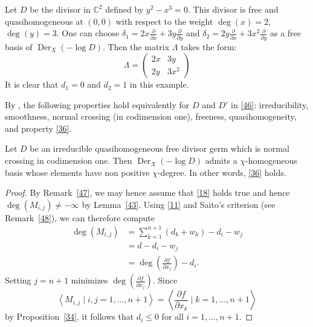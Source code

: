 \begin{exa}
Let $D$ be the divisor in ${\mathds{C}}^2$ defined by $y^2-x^3=0$. 
This divisor is free and quasihomogeneous at $(0,0)$ with respect to the weight $\deg(x)=2$, $\deg(y)=3$. 
One can choose $\delta_1=2x \frac{\partial}{\partial x} + 3 y \frac{\partial}{\partial y}$ and $\delta_2=2y\frac{\partial}{\partial x} + 3x^2\frac{\partial}{\partial y}$ as a free basis of $\operatorname{Der}_X(-\log D)$. 
Then the matrix $\Lambda$ takes the form:
\begin{equation*}
\Lambda=
\begin{pmatrix}
2x & 3y \\
2y & 3x^2
\end{pmatrix}
\end{equation*}
It is clear that $d_1=0$ and $d_2=1$ in this example.
\end{exa}

\begin{rmk}\label{47}
By \cite[Lem.~2.2.(iv)]{CMN96}, the following properties hold equivalently for $D$ and $D'$ in \eqref{46}: irreducibility, smoothness, normal crossing (in codimension one), freeness, quasihomogeneity, and property \eqref{36}.
\end{rmk}

\begin{prp}\label{20}
Let $D$ be an irreducible quasihomogeneous free divisor germ which is normal crossing in codimension one.
Then $\operatorname{Der}_X(-\log D)$ admits a $\chi$-homogeneous basis whose elements have non positive $\chi$-degree.
In other words, \eqref{36} holds.
\end{prp}

\begin{proof}
By Remark~\ref{47}, we may hence assume that \eqref{18} holds true and hence $\deg(M_{i,j})\ne-\infty$ by Lemma~\ref{43}.
Using \eqref{11} and Saito's criterion (see Remark~\ref{48}), we can therefore compute
\begin{align*}
\deg(M_{i,j}) 
&=\sum_{k=1}^{n+1}(d_k+w_k)-d_i-w_j \\
&=d-d_i-w_j \\
&=\deg\left(\frac{\partial f}{\partial x_j}\right)-d_i.
\end{align*}
Setting $j=n+1$ minimizes $\deg\left(\frac{\partial f}{\partial x_j}\right)$.
Since 
\[
{{\left\langle{M_{i,j}\mid i,j=1,\dots,n+1}\right\rangle}}={{\left\langle{\frac{\partial f}{\partial x_k}\mid k=1,\dots,n+1}\right\rangle}}
\]
by Proposition~\ref{34}, it follows that $d_i\le 0$ for all $i=1,\dots,n+1$.
\end{proof}

